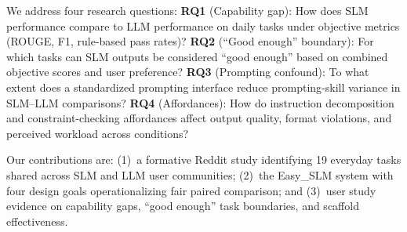 We address four research questions:
\textbf{RQ1} (Capability gap): How does SLM performance compare to LLM
performance on daily tasks under objective metrics (ROUGE, F1, rule-based
pass rates)?
\textbf{RQ2} (``Good enough'' boundary): For which tasks can SLM outputs be
considered ``good enough'' based on combined objective scores and user
preference?
\textbf{RQ3} (Prompting confound): To what extent does a standardized
prompting interface reduce prompting-skill variance in SLM--LLM comparisons?
\textbf{RQ4} (Affordances): How do instruction decomposition and
constraint-checking affordances affect output quality, format violations, and
perceived workload across conditions?

Our contributions are: (1)~a formative Reddit study identifying 19 everyday
tasks shared across SLM and LLM user communities; (2)~the Easy\_SLM system
with four design goals operationalizing fair paired comparison; and (3)~user
study evidence on capability gaps, ``good enough'' task boundaries, and
scaffold effectiveness.
